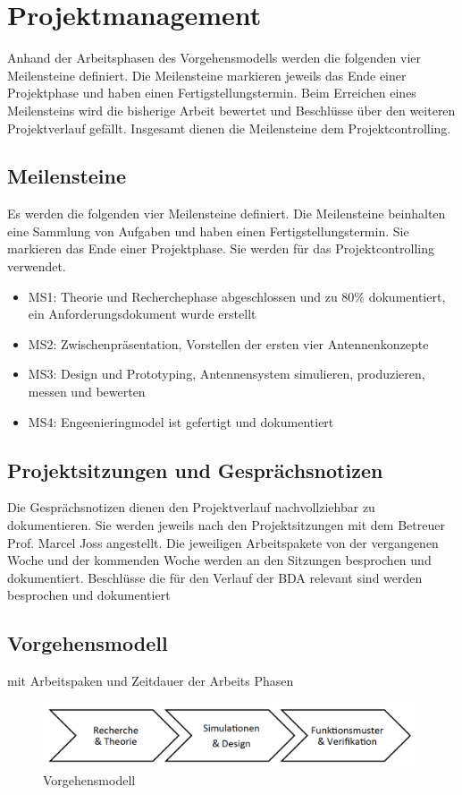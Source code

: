\newpage
\chapter{Projektmanagement}
Anhand der Arbeitsphasen  des Vorgehensmodells werden die folgenden vier Meilensteine definiert. Die Meilensteine markieren jeweils das Ende einer Projektphase und haben einen Fertigstellungstermin. Beim Erreichen eines Meilensteins wird die bisherige Arbeit bewertet und Beschlüsse über den weiteren Projektverlauf gefällt. Insgesamt dienen die Meilensteine dem Projektcontrolling.
\section{Meilensteine}
Es werden die folgenden vier Meilensteine definiert. Die Meilensteine
beinhalten   eine Sammlung von Aufgaben und haben einen
Fertigstellungstermin. Sie markieren das Ende einer Projektphase. Sie
werden für das Projektcontrolling verwendet. 
	\begin{itemize}
		\item MS1: Theorie und Recherchephase abgeschlossen und zu 80\% dokumentiert, ein Anforderungsdokument wurde erstellt
		\item MS2: Zwischenpräsentation, Vorstellen der ersten vier Antennenkonzepte
		\item MS3: Design und Prototyping, Antennensystem simulieren, produzieren, messen und bewerten
		\item MS4: Engeenieringmodel ist gefertigt und dokumentiert
	\end{itemize}

\section{Projektsitzungen und Gesprächsnotizen}
Die Gesprächsnotizen dienen den Projektverlauf nachvollziehbar zu dokumentieren. Sie werden jeweils nach den Projektsitzungen mit dem Betreuer Prof. Marcel Joss angestellt. Die jeweiligen Arbeitspakete von der vergangenen Woche und der kommenden Woche werden an den Sitzungen besprochen und dokumentiert. Beschlüsse die für den Verlauf der BDA relevant sind werden besprochen und dokumentiert
\section{Vorgehensmodell}
mit Arbeitspaken und Zeitdauer der Arbeits Phasen
\begin{figure}[!ht]
	\begin{center}
		\includegraphics[width=11cm]{content/bilder/Vorgehensmodell.pdf}%
	\end{center}
	\caption{Vorgehensmodell}
	\label{Vorgehensmodell}
\end{figure}
